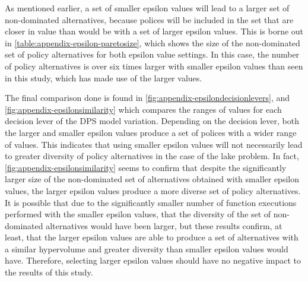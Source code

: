 As mentioned earlier, a set of smaller epsilon values will lead to a larger set of non-dominated alternatives, because polices will be included in the set that are closer in value than would be with a set of larger epsilon values. This is borne out in \cref{table:appendix-epsilon-paretosize}, which shows the size of the non-dominated set of policy alternatives for both epsilon value settings. In this case, the number of policy alternatives is over six times larger with smaller epsilon values than seen in this study, which has made use of the larger values. 

The final comparison done is found in \cref{fig:appendix-epsilondecisionlevers}, and \cref{fig:appendix-epsilonsimilarity} which compares the ranges of values for each decision lever of the DPS model variation. Depending on the decision lever, both the larger and smaller epsilon values produce a set of polices with a wider range of values. This indicates that using smaller epsilon values will not necessarily lead to greater diversity of policy alternatives in the case of the lake problem. In fact, \cref{fig:appendix-epsilonsimilarity} seems to confirm that despite the significantly larger size of the non-dominated set of alternatives obtained with smaller epsilon values, the larger epsilon values produce a more diverse set of policy alternatives. It is possible that due to the significantly smaller number of function executions performed with the smaller epsilon values, that the diversity of the set of non-dominated alternatives would have been larger, but these results confirm, at least, that the larger epsilon values are able to produce a set of alternatives with a similar hypervolume and greater diversity than smaller epsilon values would have. Therefore, selecting larger epsilon values should have no negative impact to the results of this study. 



